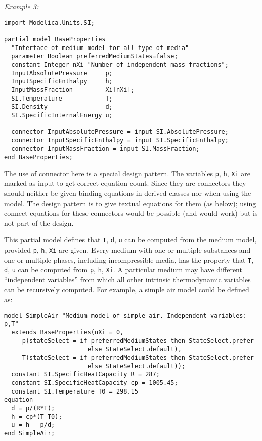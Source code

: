 \begin{example}
\emph{Example 3:}
\begin{lstlisting}[language=modelica]
import Modelica.Units.SI;

partial model BaseProperties
  "Interface of medium model for all type of media"
  parameter Boolean preferredMediumStates=false;
  constant Integer nXi "Number of independent mass fractions";
  InputAbsolutePressure     p;
  InputSpecificEnthalpy     h;
  InputMassFraction         Xi[nXi];
  SI.Temperature            T;
  SI.Density                d;
  SI.SpecificInternalEnergy u;

  connector InputAbsolutePressure = input SI.AbsolutePressure;
  connector InputSpecificEnthalpy = input SI.SpecificEnthalpy;
  connector InputMassFraction = input SI.MassFraction;
end BaseProperties;
\end{lstlisting}

The use of connector here is a special design pattern. The
variables \lstinline!p!, \lstinline!h!, \lstinline!Xi! are marked as input to get
correct equation count. Since they are connectors they should neither be
given binding equations in derived classes nor when using the model. The
design pattern is to give textual equations for them (as below); using
connect-equations for these connectors would be possible (and would
work) but is not part of the design.

This partial model defines that \lstinline!T!, \lstinline!d!, \lstinline!u! can be computed from
the medium model, provided \lstinline!p!, \lstinline!h!, \lstinline!Xi! are given.  Every medium with
one or multiple substances and one or multiple phases, including
incompressible media, has the property that \lstinline!T!, \lstinline!d!, \lstinline!u! can be computed
from \lstinline!p!, \lstinline!h!, \lstinline!Xi!. A particular medium may have different ``independent
variables'' from which all other intrinsic thermodynamic variables can
be recursively computed. For example, a simple air model could be
defined as:
\begin{lstlisting}[language=modelica]
model SimpleAir "Medium model of simple air. Independent variables: p,T"
  extends BaseProperties(nXi = 0,
     p(stateSelect = if preferredMediumStates then StateSelect.prefer
                       else StateSelect.default),
     T(stateSelect = if preferredMediumStates then StateSelect.prefer
                       else StateSelect.default));
  constant SI.SpecificHeatCapacity R = 287;
  constant SI.SpecificHeatCapacity cp = 1005.45;
  constant SI.Temperature T0 = 298.15
equation
  d = p/(R*T);
  h = cp*(T-T0);
  u = h - p/d;
end SimpleAir;
\end{lstlisting}


\end{example}
